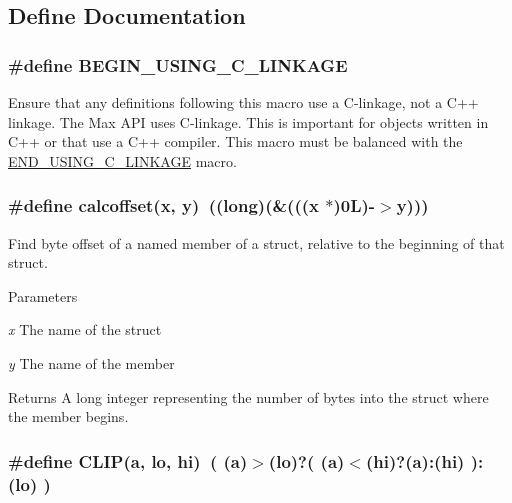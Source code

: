 \subsection{Define Documentation}
\hypertarget{group__misc_ga06f35de4fc025809ab1cbb06f55b6495}{
\subsubsection[{BEGIN\_\-USING\_\-C\_\-LINKAGE}]{\setlength{\rightskip}{0pt plus 5cm}\#define BEGIN\_\-USING\_\-C\_\-LINKAGE}}
\label{group__misc_ga06f35de4fc025809ab1cbb06f55b6495}


Ensure that any definitions following this macro use a C-\/linkage, not a C++ linkage. The Max API uses C-\/linkage. This is important for objects written in C++ or that use a C++ compiler. This macro must be balanced with the \hyperlink{group__misc_gaffa4cac92b5d24cbccfe6c852de92a2e}{END\_\-USING\_\-C\_\-LINKAGE} macro. \hypertarget{group__misc_gaad95899dfbc7b5b8fe11921643ef46f0}{
\subsubsection[{calcoffset}]{\setlength{\rightskip}{0pt plus 5cm}\#define calcoffset(x, \/  y)~((long)(\&(((x $\ast$)0L)-\/$>$y)))}}
\label{group__misc_gaad95899dfbc7b5b8fe11921643ef46f0}


Find byte offset of a named member of a struct, relative to the beginning of that struct. 
\begin{DoxyParams}{Parameters}
\item[{\em x}]The name of the struct \item[{\em y}]The name of the member \end{DoxyParams}
\begin{DoxyReturn}{Returns}
A long integer representing the number of bytes into the struct where the member begins. 
\end{DoxyReturn}
\hypertarget{group__misc_ga79f6ccd4ae5e1eb6d56058350794f877}{
\subsubsection[{CLIP}]{\setlength{\rightskip}{0pt plus 5cm}\#define CLIP(a, \/  lo, \/  hi)~( (a)$>$(lo)?( (a)$<$(hi)?(a):(hi) ):(lo) )}}
\label{group__misc_ga79f6ccd4ae5e1eb6d56058350794f877}


